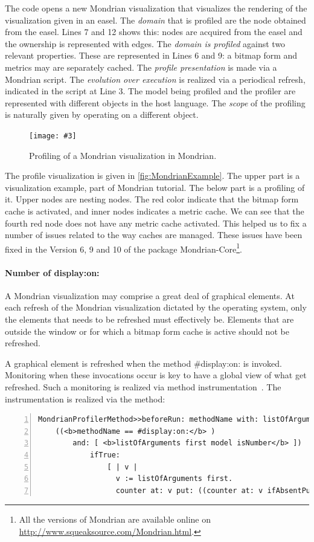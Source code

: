 \documentclass[runningheads]{llncs}
\newcommand{\fig}[4]{
	\begin{figure}[#1]
		\centering
		\texttt{[image: \#3]}
		\caption{\label{fig:#3}#4}
	\end{figure}}
\begin{document}
The code opens a new Mondrian visualization that visualizes the rendering of the visualization given in an easel. The \emph{domain} that is profiled are the node obtained from the easel. Lines 7 and 12 shows this: nodes are acquired from the easel and the ownership is represented with edges. The \emph{domain is profiled} against two relevant properties. These are represented in Lines 6 and 9: a bitmap form and metrics may are separately cached. The \emph{profile presentation} is made via a Mondrian script. The \emph{evolution over execution} is realized via a periodical refresh, indicated in the script at Line 3. The model being profiled and the profiler are represented with different objects in the host language. The \emph{scope} of the profiling is naturally given by operating on a different object.

\fig{}{.8}{MondrianExample}{Profiling of a Mondrian visualization in Mondrian.}

The profile visualization is given in \autoref{fig:MondrianExample}. The upper part is a visualization example, part of Mondrian tutorial. The below part is a profiling of it. Upper nodes are nesting nodes. The red color indicate that the bitmap form cache is activated, and inner nodes indicates a metric cache. We can see that the fourth red node does not have any metric cache activated. This helped us to fix a number of issues related to the way caches are managed. These issues have been fixed in the Version 6, 9 and 10 of the package Mondrian-Core\footnote{All the versions of Mondrian are available online on \url{http://www.squeaksource.com/Mondrian.html}.}.

\paragraph{Number of display:on:}
A Mondrian visualization may comprise a great deal of graphical elements. At each refresh of the Mondrian visualization dictated by the operating system, only the elements that needs to be refreshed must effectively be. Elements that are outside the window or for which a bitmap form cache is active should not be refreshed. 

A graphical element is refreshed when the method {\sf \#display:on:} is invoked. Monitoring when these invocations occur is key to have a global view of what get refreshed. Such a monitoring is realized via method instrumentation~\cite{Berg10d}. The instrumentation is realized via the method:

\begin{lstlisting}[numbers=left]
MondrianProfilerMethod>>beforeRun: methodName with: listOfArguments in: receiver
	((<b>methodName == #display:on:</b> ) 
		and: [ <b>listOfArguments first model isNumber</b> ])
			ifTrue: 
				[ | v |
				  v := listOfArguments first.
				  counter at: v put: ((counter at: v ifAbsentPut: [ 0 ]) + 1 ) ]
\end{lstlisting}
\end{document}
